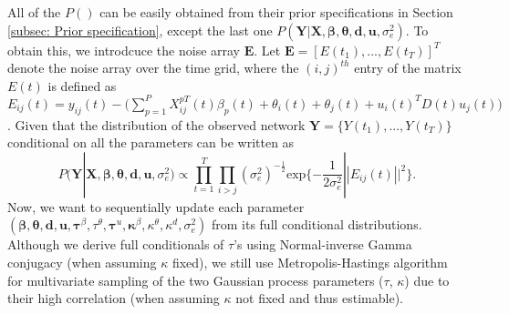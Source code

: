 \documentclass[a4paper]{article}
\begin{document}
	All of the $P()$ can be easily obtained from their prior specifications in Section \ref{subsec: Prior specification}, except the last one $P(\boldsymbol{Y}|\boldsymbol{X}, \boldsymbol{\beta}, \boldsymbol{\theta}, \boldsymbol{d}, \boldsymbol{u},\sigma_e^2)$. To obtain this, we introdcuce the noise array $\boldsymbol{E}$. Let $\boldsymbol{E} = [E(t_1),...,E(t_T)]^T$ denote the noise array over the time grid, where the $(i, j)^{th}$ entry of the matrix $E(t)$ is defined as $E_{ij}(t) = y_{ij}(t)-\big(\sum_{p=1}^P{X^{pT}_{ij}}(t)\beta_p(t)+\theta_i(t)+\theta_j(t)+u_i(t)^TD(t)u_j(t)\big)$. Given that the distribution of the observed network $\boldsymbol{Y}=\{Y(t_1),...,Y(t_T)\}$  conditional on all the parameters can be written as
	\begin{equation}
	P(\boldsymbol{Y}|\boldsymbol{X}, \boldsymbol{\beta}, \boldsymbol{\theta}, \boldsymbol{d}, \boldsymbol{u},\sigma_e^2)\propto  \prod_{t=1}^T\prod_{i>j}(\sigma_e^2)^{-\frac{1}{2}}\mbox{exp}\{-\frac{1}{2\sigma_e^2}||E_{ij}(t)||^2\}.
	\end{equation}
Now, we want to sequentially update each parameter $(\boldsymbol{\beta}, \boldsymbol{\theta}, \boldsymbol{d}, \boldsymbol{u}, \boldsymbol{\tau}^\beta, \tau^\theta, \boldsymbol{\tau}^u, \boldsymbol{\kappa}^\beta, \kappa^\theta, \kappa^d, \sigma_e^2)$ from its full conditional distributions. Although we derive full conditionals of $\tau$'s using Normal-inverse Gamma conjugacy (when assuming $\kappa$ fixed), we still use Metropolis-Hastings algorithm for multivariate sampling of the two Gaussian process parameters ($\tau$, $\kappa$) due to their high correlation (when assuming $\kappa$ not fixed and thus estimable).
\end{document}
